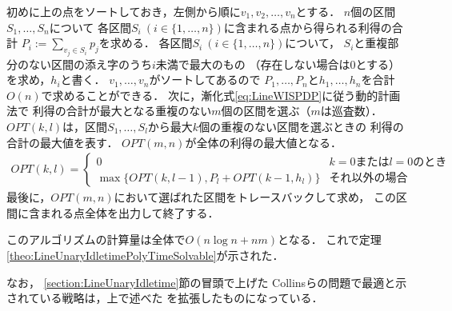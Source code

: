 初めに{\graphLine}上の点をソートしておき，左側から順に$v_1, v_2, \ldots, v_n$とする．
$n$個の区間$S_1, \ldots, S_n$について
各区間$S_i\ (i \in \{ 1, \ldots, n \})$に含まれる点から得られる利得の合計
$P_i := \sum_{v_j \in S_i} p_j$を求める．
%
各区間$S_i\ (i \in \{ 1, \ldots, n \})$について，
$S_i$と重複部分のない区間の添え字のうち$i$未満で最大のもの
（存在しない場合は$0$とする）を求め，$h_i$と書く．
$v_1, \ldots, v_n$がソートしてあるので
$P_1, \ldots, P_n$と$h_1, \ldots, h_n$を合計$O(n)$で求めることができる．
%
次に，漸化式\eqref{eq:LineWISPDP}に従う動的計画法で
利得の合計が最大となる重複のない$m$個の区間を選ぶ（$m$は巡査数）．
$OPT(k, l)$は，区間$S_1, \ldots, S_l$から最大$k$個の重複のない区間を選ぶときの
利得の合計の最大値を表す．
$OPT(m, n)$が全体の利得の最大値となる．
\begin{align}
  \label{eq:LineWISPDP}
  OPT(k, l) = 
  \begin{cases}
    0 & \text{$k = 0$または$l = 0$のとき} \\
    \max \{
      OPT(k, l - 1), 
      P_l + OPT(k - 1, h_l)
    \}
    & \text{それ以外の場合}
  \end{cases}
\end{align}
最後に，$OPT(m, n)$において選ばれた区間をトレースバックして求め，
この区間に含まれる点全体を出力して終了する．

このアルゴリズムの計算量は全体で$O(n \log n + nm)$となる．
これで定理\ref{theo:LineUnaryIdletimePolyTimeSolvable}が示された．

なお，
\ref{section:LineUnaryIdletime}節の冒頭で上げた
Collinsらの問題で最適と示されている戦略は，上で述べた
{\indSectOperation}を拡張したものになっている\cite[Theorem 2.1]{collins2013optimal}．

